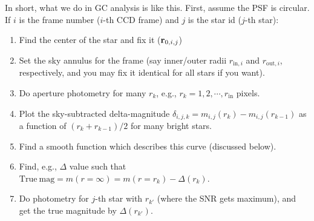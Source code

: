 In short, what we do in GC analysis is like this. First, assume the PSF is circular. If $ i $ is the frame number ($ i $-th CCD frame) and $ j $ is the star id ($ j $-th star):
\begin{enumerate}
\item Find the center of the star and fix it ($ \vb{r}_{0, i, j} $)
\item Set the sky annulus for the frame (say inner/outer radii $ r_{\mathrm{in}, i} $ and $ r_{\mathrm{out}, i} $, respectively, and you may fix it identical for all stars if you want).
\item Do aperture photometry for many $ r_k $, e.g., $ r_k = 1, 2, \cdots, r_\mathrm{in} $ pixels.
\item Plot the sky-subtracted delta-magnitude $ \delta_{i, j, k} = m_{i, j}(r_k) - m_{i, j}(r_{k-1}) $ as a function of $ (r_k + r_{k-1})/2 $ for many bright stars.
\item Find a smooth function which describes this curve (discussed below).
\item Find, e.g., $ \Delta $ value such that $ \mathrm{True~mag} = m(r = \infty) = m(r = r_k) - \Delta(r_k) $.
\item Do photometry for $ j $-th star with $ r_{k'} $ (where the SNR gets maximum), and get the true magnitude by $ \Delta(r_{k'}) $.
\end{enumerate}


